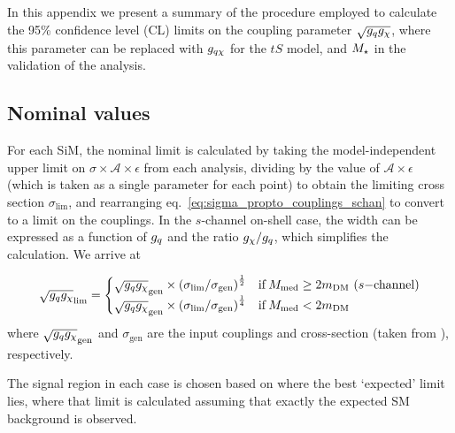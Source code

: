 In this appendix we present a summary of the procedure employed to calculate the 95\% confidence level (CL) limits on the coupling parameter $\sqrt{g_q g_{\chi}}$, where this parameter can be replaced with $g_{q \chi}$ for the $tS$ model, and $M_{\star}$ in the validation of the \monojet analysis.

\subsection{Nominal values}
For each SiM, the nominal limit is calculated by taking the model-independent upper limit on $\sigma \times \mathcal{A} \times \epsilon$ from each analysis, dividing by the value of $\mathcal{A} \times \epsilon$ (which is taken as a single parameter for each point) to obtain the limiting cross section $\sigma_{\mathrm{lim}}$, and rearranging eq.~\ref{eq:sigma_propto_couplings_schan} to convert to a limit on the couplings. In the $s$-channel on-shell case, the width can be expressed as a function of $g_q$ and the ratio $g_{\chi} / g_q$, which simplifies the calculation. We arrive at

\begin{equation}
  \sqrt{g_q g_{\chi}}_{\mathrm{lim}} =
  \begin{cases}
      \sqrt{g_q g_{\chi}}_{\mathrm{gen}} \times \left( \sigma_{\mathrm{lim}} / \sigma_{\mathrm{gen}} \right)^{\frac{1}{2}} & \mathrm{ if } \, M_{\mathrm{med}} \geq 2 m_{\mathrm{DM}} \,\, (s\mathrm{-channel})\\
      \sqrt{g_q g_{\chi}}_{\mathrm{gen}} \times \left( \sigma_{\mathrm{lim}} / \sigma_{\mathrm{gen}} \right)^{\frac{1}{4}} & \mathrm{ if } \, M_{\mathrm{med}} < 2 m_{\mathrm{DM}} \\
  \end{cases}
  \label{eq:nominal_limit}
\end{equation}
where $\sqrt{g_q g_{\chi}}_{\mathrm{gen}}$ and $\sigma_{\mathrm{gen}}$ are the input couplings and cross-section (taken from \PYTHIA), respectively.

The signal region in each case is chosen based on where the best `expected' limit lies, where that limit is calculated assuming that exactly the expected SM background is observed.




